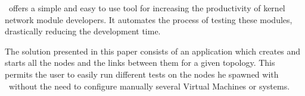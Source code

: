 
\project\ offers a simple and easy to use tool for increasing the productivity of kernel network module developers. It automates the process of testing these modules, drastically reducing the development time.

The solution presented in this paper consists of an application which creates and starts all the nodes and the links between them for a given topology. This permits the user to easily run different tests on the nodes he spawned with \project\ without the need to configure manually several Virtual Machines or systems.
